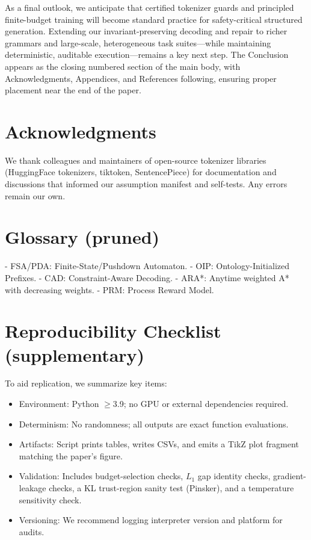 \documentclass{article}
\begin{document}
As a final outlook, we anticipate that certified tokenizer guards and principled finite-budget training will become standard practice for safety-critical structured generation. Extending our invariant-preserving decoding and repair to richer grammars and large-scale, heterogeneous task suites—while maintaining deterministic, auditable execution—remains a key next step. The Conclusion appears as the closing numbered section of the main body, with Acknowledgments, Appendices, and References following, ensuring proper placement near the end of the paper.

\section*{Acknowledgments}
We thank colleagues and maintainers of open-source tokenizer libraries (HuggingFace tokenizers, tiktoken, SentencePiece) for documentation and discussions that informed our assumption manifest and self-tests. Any errors remain our own.

\appendix
\section{Glossary (pruned)}
- FSA/PDA: Finite-State/Pushdown Automaton.
- OIP: Ontology-Initialized Prefixes.
- CAD: Constraint-Aware Decoding.
- ARA*: Anytime weighted A* with decreasing weights.
- PRM: Process Reward Model.

\section{Reproducibility Checklist (supplementary)}
To aid replication, we summarize key items:
\begin{itemize}[leftmargin=*]
\item Environment: Python $\ge$3.9; no GPU or external dependencies required.
\item Determinism: No randomness; all outputs are exact function evaluations.
\item Artifacts: Script prints tables, writes CSVs, and emits a TikZ plot fragment matching the paper’s figure.
\item Validation: Includes budget-selection checks, $L_1$ gap identity checks, gradient-leakage checks, a KL trust-region sanity test (Pinsker), and a temperature sensitivity check.
\item Versioning: We recommend logging interpreter version and platform for audits.
\end{itemize}
\end{document}
